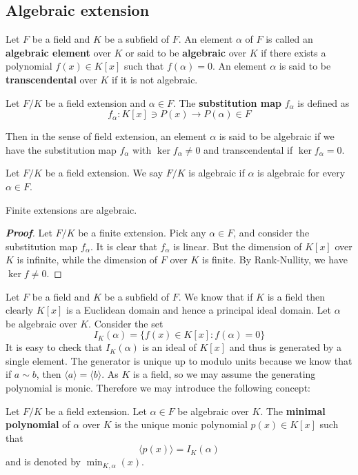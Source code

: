 \subsection{Algebraic extension}
\begin{definition} Let $F$ be a field and $K$ be a subfield of $F$. An element $\alpha$ of $F$ is called an {\bf algebraic element} over $K$ or said to be {\bf algebraic} over $K$ if there exists a polynomial $f(x) \in K[x]$ such that $f(\alpha)=0$. An element $\alpha$ is said to be {\bf transcendental} over $K$ if it is not algebraic.
\end{definition}
\begin{definition} Let $F/K$ be a field extension and $\alpha \in F$. The {\bf substitution map} $f_\alpha$ is defined as $$f_\alpha: K[x] \ni P(x) \rightarrow P(\alpha) \in F$$
\end{definition}
Then in the sense of field extension, an element $\alpha$ is said to be algebraic if we have the substitution map $f_\alpha$ with $\ker{f_\alpha} \neq 0$ and transcendental if $\ker{f_\alpha}=0$.
\begin{definition} Let $F/K$ be a field extension. We say $F/K$ is algebraic if $\alpha$ is algebraic for every $\alpha \in F$.
\end{definition}
\begin{proposition} Finite extensions are algebraic.
\end{proposition}
\begin{proof}[\bf Proof] Let $F/K$ be a finite extension. Pick any $\alpha \in F$, and consider the substitution map $f_\alpha$.
It is clear that $f_\alpha$ is linear. But the dimension of $K[x]$ over $K$ is infinite, while the dimension of $F$ over $K$ is finite. By Rank-Nullity, we have $\ker{f} \neq 0$.
\end{proof}
Let $F$ be a field and $K$ be a subfield of $F$. We know that if $K$ is a field then clearly $K[x]$ is a Euclidean domain and hence a principal ideal domain. Let $\alpha$ be algebraic over $K$. Consider the set $$I_K(\alpha)=\{f(x) \in K[x]: f(\alpha)=0\}$$
It is easy to check that $I_K(\alpha)$ is an ideal of $K[x]$ and thus is generated by a single element. The generator is unique up to modulo units because we know that if $a \sim b$, then $\langle a \rangle=
\langle b \rangle$. As $K$ is a field, so we may assume the generating polynomial is monic.
Therefore we may introduce the following concept:
\begin{definition} Let $F/K$ be a field extension. Let $\alpha \in F$ be algebraic over $K$.
The {\bf minimal polynomial} of $\alpha$ over $K$ is the unique monic polynomial $p(x) \in K[x]$ such that
$$\langle p(x) \rangle =I_K(\alpha)$$
and is denoted by $\min_{K,\alpha}(x)$.
\end{definition}
